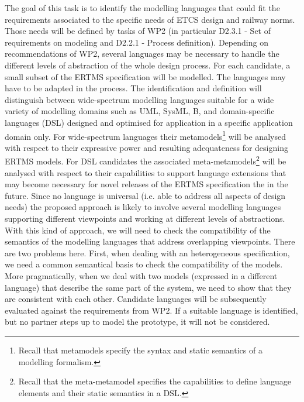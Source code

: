 \documentclass{template/openetcs_article}
\begin{document}
The goal of this task is to identify the modelling languages that
could fit the requirements associated to the specific needs of ETCS
design and railway norms. Those needs will be defined by tasks of WP2 
(in particular D2.3.1 - Set of requirements on modeling and 
D2.2.1 - Process definition). 
Depending on recommendations of WP2, several languages may
be necessary to handle the different levels of abstraction of the
whole design process.  For each candidate, a small subset of the ERTMS
specification will be modelled. The languages may have to be adapted
in the process. The identification and definition will distinguish
between wide-spectrum modelling languages suitable for a wide variety
of modelling domains such as UML, SysML, B, and domain-specific
languages (DSL) designed and optimised for application in a specific
application domain only.  For wide-spectrum languages their
metamodels\footnote{Recall that metamodels specify the syntax and
  static semantics of a modelling formalism.} will be analysed with
respect to their expressive power and resulting adequateness for
designing ERTMS models.  For DSL candidates the associated
meta-metamodels\footnote{Recall that the meta-metamodel specifies the
  capabilities to define language elements and their static semantics
  in a DSL.}  will be analysed with respect to their capabilities to
support language extensions that may become necessary for novel
releases of the ERTMS specification the in the future.  Since no
language is universal (i.e. able to address all aspects of
design needs) the proposed approach is likely to involve several
modelling languages supporting different viewpoints and working at
different levels of abstractions. With this kind of approach, we will
need to check the compatibility of the semantics of the modelling
languages that address overlapping viewpoints. There are two problems
here. First, when dealing with an heterogeneous specification, we need
a common semantical basis to check the compatibility of the
models. More pragmatically, when we deal with two models (expressed in
a different language) that describe the same part of the system, we
need to show that they are consistent with each other. Candidate
languages will be subsequently evaluated against the requirements from
WP2.  If a suitable language is identified, but no partner steps up to
model the prototype, it will not be considered.

\end{document}
